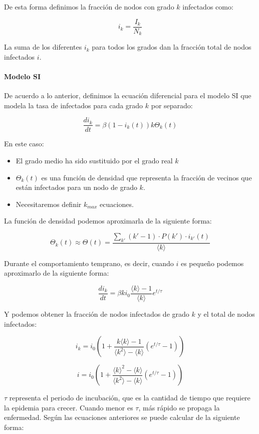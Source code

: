 \documentclass[]{article}
\begin{document}
De esta forma definimos la fracción de nodos con grado \(k\) infectados
como:

\[i_k  = \frac{I_k}{N_k}\]

La suma de los diferentes \(i_k\) para todos los grados dan la fracción
total de nodos infectados \(i\).

\paragraph*{Modelo SI}\label{modelo-si-1}

De acuerdo a lo anterior, definimos la ecuación diferencial para el
modelo SI que modela la tasa de infectados para cada grado \(k\) por
separado:

\[\frac{di_k}{dt} = \beta (1-i_k(t))k \Theta_k(t)\]

En este caso:

\begin{itemize}
\itemsep1pt\parskip0pt
\item
  El grado medio ha sido sustituido por el grado real \(k\)
\item
  \(\Theta_k(t)\) es una función de densidad que representa la fracción
  de vecinos que están infectados para un nodo de grado \(k\).
\item
  Necesitaremos definir \(k_{max}\) ecuaciones.
\end{itemize}

La función de densidad podemos aproximarla de la siguiente forma:

\[\Theta_k(t) \approx \Theta(t) = \frac{\sum_{k'}(k'-1)\cdot P(k') \cdot i_{k'}(t)}{\langle k \rangle}\]

Durante el comportamiento temprano, es decir, cuando \(i\) es pequeño
podemos aproximarlo de la siguiente forma:

\[\frac{di_k}{dt} = \beta k i_0 \frac{\langle k \rangle-1}{\langle k \rangle} e^{t/\tau}\]

Y podemos obtener la fracción de nodos infectados de grado \(k\) y el
total de nodos infectados:

\[i_k = i_0 (1+ \frac{k \langle k \rangle -1}{\langle k^2 \rangle - \langle k \rangle}(e^{t/\tau}-1))\]

\[i = i_0 (1+ \frac{\langle k \rangle^2 - \langle k \rangle}{\langle k^2 \rangle - \langle k \rangle}(e^{t/\tau}-1))\]

\(\tau\) representa el periodo de incubación, que es la cantidad de
tiempo que requiere la epidemia para crecer. Cuando menor es \(\tau\),
más rápido se propaga la enfermedad. Según las ecuaciones anteriores se
puede calcular de la siguiente forma:
\end{document}
